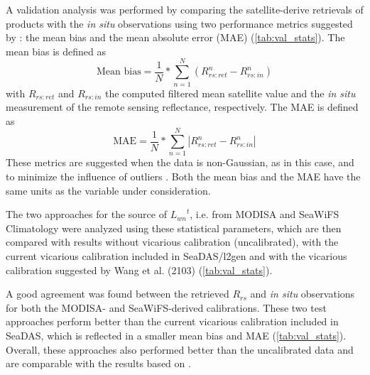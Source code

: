 \documentclass[10pt]{article}
\begin{document}
A validation analysis was performed by comparing the satellite-derive retrievals of products with the {\it in situ} observations using two performance metrics suggested by  \cite{Seegers:18}: the mean bias and the mean absolute error (MAE) (\autoref{tab:val_stats}). The mean bias is defined as 
\begin{equation}
    \text{Mean bias} = \frac{1}{N}*\sum_{n=1}^N(R_{rs:ret}^n-R_{rs:in}^n)
\end{equation}
with $R_{rs:ret}$ and $R_{rs:in}$ the computed filtered mean satellite value and the {\it in situ} measurement of the remote sensing reflectance, respectively. The MAE is defined as 
\begin{equation}
    \text{MAE} = \frac{1}{N}*\sum_{n=1}^N\left|R_{rs:ret}^n-R_{rs:in}^n\right|
\end{equation}
These metrics are suggested when the data is non-Gaussian, as in this case, and to minimize the influence of outliers \cite{Seegers:18}. Both the mean bias and the MAE have the same units as the variable under consideration. 

The two approaches for the source of ${L_{wn}}^t$, i.e. from MODISA and SeaWiFS Climatology were analyzed using these statistical parameters, which are then compared with results without vicarious calibration (uncalibrated), with the current vicarious calibration included in SeaDAS/l2gen and with the vicarious calibration suggested by Wang et al. (2103) \cite{Wang:13} (\autoref{tab:val_stats}).

A good agreement was found between the retrieved $R_{rs}$ and {\it in situ} observations for both the MODISA- and SeaWiFS-derived calibrations. These two test approaches perform better than the current vicarious calibration included in SeaDAS, which is reflected in a smaller mean bias and MAE (\autoref{tab:val_stats}). Overall, these approaches also performed better than the uncalibrated data and are comparable with the results based on \cite{Wang:13}.
\end{document}
